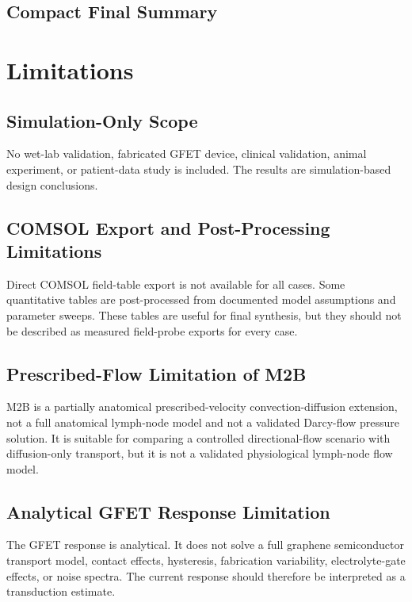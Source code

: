 ﻿\documentclass[12pt,a4paper,oneside]{report}
\begin{document}


\section{Compact Final Summary}


\chapter{Limitations}

\section{Simulation-Only Scope}
No wet-lab validation, fabricated GFET device, clinical validation, animal experiment, or patient-data study is included. The results are simulation-based design conclusions.

\section{COMSOL Export and Post-Processing Limitations}
Direct COMSOL field-table export is not available for all cases. Some quantitative tables are post-processed from documented model assumptions and parameter sweeps. These tables are useful for final synthesis, but they should not be described as measured field-probe exports for every case.

\section{Prescribed-Flow Limitation of M2B}
M2B is a partially anatomical prescribed-velocity convection-diffusion extension, not a full anatomical lymph-node model and not a validated Darcy-flow pressure solution. It is suitable for comparing a controlled directional-flow scenario with diffusion-only transport, but it is not a validated physiological lymph-node flow model.

\section{Analytical GFET Response Limitation}
The GFET response is analytical. It does not solve a full graphene semiconductor transport model, contact effects, hysteresis, fabrication variability, electrolyte-gate effects, or noise spectra. The current response should therefore be interpreted as a transduction estimate.
\end{document}
